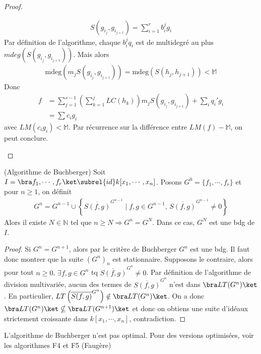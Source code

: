 \begin{proof}
\begin{enumerate}
                \begin{align*}
                    S(g_{i_j}, g_{i_{j+1}}) = \sum_{i = 1}^r b_i^jg_i
                \end{align*}
                Par définition de l'algorithme, chaque $b_i^jq_i$ est de multidegré au plus $mdeg(S(g_{i_j}, g_{i_{j+1}}))$. Mais alors
                \begin{align*}
                    \mathrm{mdeg}(m_j S(g_{i_j}, g_{i_{j+1}})) = \mathrm{mdeg}(S(h_j,h_{j+1})) < \mathbb{M}
                \end{align*}
                Donc
                \begin{align*}
                    f &= \sum_{j = 1}^{s-1} \left(\sum_{k = 1}^j LC(h_k) \right) m_j S(g_{i_j},g_{i_{j+1}}) + \sum_i q_i'g_i \\        
                    &= \sum c_ig_i                
                \end{align*}
                avec $LM(c_ig_i) < \mathbb{M}$. Par récurrence sur la différence entre $LM(f) - \mathbb{M}$, on peut conclure.
            \end{enumerate}
        \end{proof}
        \begin{coro} (Algorithme de Buchberger)
            Soit $I = \bra f_1, \cdots, f_r \ket \subrel{id} k[x_1, \cdots, x_n]$. Posons $G^0 = \{f_1, \cdots, f_r\}$ et pour $n \geq 1$, on définit
            \begin{align*}
                G^n = G^{n-1} \cup \left\{\overline{S(f,g)}^{G^{n-1}} \mid f,g \in G^{n-1},\, \overline{S(f,g)}^{G^{n-1}} \neq 0\right\} 
            \end{align*}
            Alors il existe $N \in \mathbb{N}$ tel que $n \geq N \Rightarrow G^n = G^N$. Dans ce cas, $G^N$ est une bdg de $I$.
        \end{coro}
        \begin{proof}
            Si $G^n = G^{n+1}$, alors par le critère de Buchberger $G^n$ est une bdg. Il faut donc montrer que la suite $(G^n)_n$ est stationnaire. Supposons le contraire, alors pour tout $n \geq 0$, $\exists f,g \in G^n$ tq $\overline{S(f,g)}^{G^n} \neq 0$. Par définition de l'algorithme de division multivariée, aucun des termes de $\overline{S(f,g)}^{G^n}$ n'est dans $\bra LT(G^n) \ket$. En particulier, $LT \left(\overline{S(f,g)}^{G^n} \right) \notin \bra LT(G^n) \ket$. On a donc $\bra LT(G^n) \ket \nsubseteq \bra LT(G^{n+1}) \ket$ et donc on obtiens une suite d'idéaux strictement croissante dans $k[x_1, \cdots, x_n]$, contradiction.
        \end{proof}
        \begin{remq}
            L'algorithme de Buchberger n'est pas optimal. Pour des versions optimisées, voir les algorithmes F4 et F5 (Faugère)
        \end{remq}

